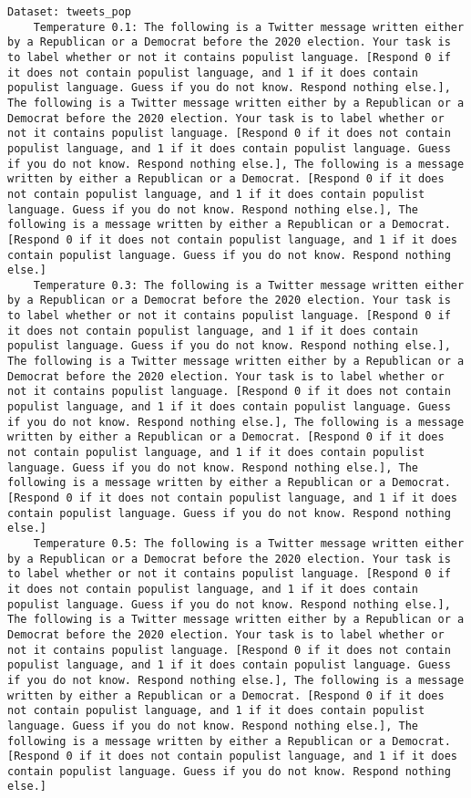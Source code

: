 \begin{lstlisting}[label=lst:poor_performing_prompts]
Dataset: tweets_pop
	Temperature 0.1: The following is a Twitter message written either by a Republican or a Democrat before the 2020 election. Your task is to label whether or not it contains populist language. [Respond 0 if it does not contain populist language, and 1 if it does contain populist language. Guess if you do not know. Respond nothing else.], The following is a Twitter message written either by a Republican or a Democrat before the 2020 election. Your task is to label whether or not it contains populist language. [Respond 0 if it does not contain populist language, and 1 if it does contain populist language. Guess if you do not know. Respond nothing else.], The following is a message written by either a Republican or a Democrat. [Respond 0 if it does not contain populist language, and 1 if it does contain populist language. Guess if you do not know. Respond nothing else.], The following is a message written by either a Republican or a Democrat. [Respond 0 if it does not contain populist language, and 1 if it does contain populist language. Guess if you do not know. Respond nothing else.]
	Temperature 0.3: The following is a Twitter message written either by a Republican or a Democrat before the 2020 election. Your task is to label whether or not it contains populist language. [Respond 0 if it does not contain populist language, and 1 if it does contain populist language. Guess if you do not know. Respond nothing else.], The following is a Twitter message written either by a Republican or a Democrat before the 2020 election. Your task is to label whether or not it contains populist language. [Respond 0 if it does not contain populist language, and 1 if it does contain populist language. Guess if you do not know. Respond nothing else.], The following is a message written by either a Republican or a Democrat. [Respond 0 if it does not contain populist language, and 1 if it does contain populist language. Guess if you do not know. Respond nothing else.], The following is a message written by either a Republican or a Democrat. [Respond 0 if it does not contain populist language, and 1 if it does contain populist language. Guess if you do not know. Respond nothing else.]
	Temperature 0.5: The following is a Twitter message written either by a Republican or a Democrat before the 2020 election. Your task is to label whether or not it contains populist language. [Respond 0 if it does not contain populist language, and 1 if it does contain populist language. Guess if you do not know. Respond nothing else.], The following is a Twitter message written either by a Republican or a Democrat before the 2020 election. Your task is to label whether or not it contains populist language. [Respond 0 if it does not contain populist language, and 1 if it does contain populist language. Guess if you do not know. Respond nothing else.], The following is a message written by either a Republican or a Democrat. [Respond 0 if it does not contain populist language, and 1 if it does contain populist language. Guess if you do not know. Respond nothing else.], The following is a message written by either a Republican or a Democrat. [Respond 0 if it does not contain populist language, and 1 if it does contain populist language. Guess if you do not know. Respond nothing else.]

\end{lstlisting}
